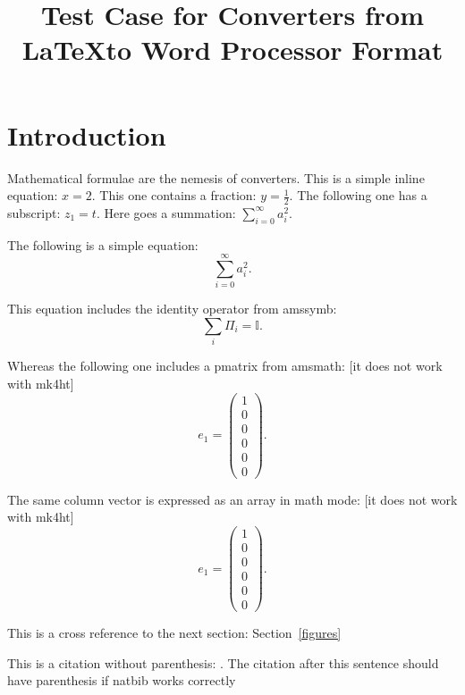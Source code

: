 \documentclass{article}
\title{Test Case for Converters from \LaTeX to Word Processor Format}
\author{}
\begin{document}
\maketitle

\section{Introduction}
Mathematical formulae are the nemesis of converters. This is a simple inline equation: $x=2$. This one contains a fraction: $y=\frac{1}{2}$. The following one has a subscript: $z_{1}=t$. Here goes a summation: $\sum_{i=0}^{\infty}a_{i}^{2}$.

The following is a simple equation:
\begin{equation}
  \sum_{i=0}^{\infty}a_{i}^{2}.
\end{equation}

This equation includes the identity operator from amssymb:
\begin{equation}
  \sum_{i}\Pi_{i}=\mathbb{I}.
\end{equation}

Whereas the following one includes a pmatrix from amsmath: [it does not work with mk4ht]
\begin{equation}
  e_{1}=\begin{pmatrix} 1 \\ 0 \\ 0 \\ 0 \\ 0 \\0 \end{pmatrix}.
\end{equation}

The same column vector is expressed as an array in math mode: [it does not work with mk4ht]
\begin{equation}
  e_{1}=\left(\begin{array}{c} 1 \\ 0 \\ 0 \\ 0 \\ 0 \\0 \end{array}\right).
\end{equation}

This is a cross reference to the next section: Section~\ref{figures}

This is a citation without parenthesis: \cite{dummy2013least}. The citation after this sentence should have parenthesis if natbib works correctly~\citep{dummy2013least}
\end{document}
